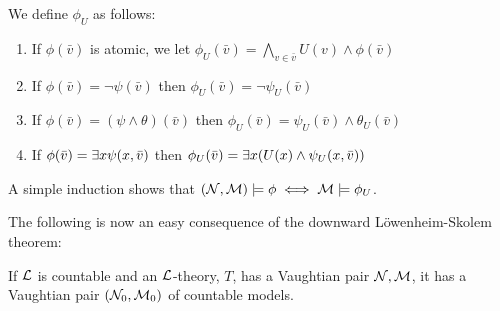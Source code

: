 We define \(\phi_U\) as follows:
\begin{enumerate}
\item If \(\phi(\bar{v})\) is atomic, we let \(\phi_U(\bar{v}) = \bigwedge\limits_{v \in \bar{v}}U(v) \land \phi(\bar{v})\)
\item If \(\phi(\bar{v}) = \neg \psi(\bar{v})\) then \(\phi_U(\bar{v}) = \neg \psi_U(\bar{v})\)
\item If \(\phi(\bar{v}) = (\psi \land \theta)(\bar{v})\) then \(\phi_U(\bar{v}) = \psi_U(\bar{v}) \land \theta_U(\bar{v})\)
\item If \(\phi(\bar{v}) = \exists x \psi(x, \bar{v})\) then \(\phi_U(\bar{v}) = \exists x (U(x) \land \psi_U(x, \bar{v}))\)
\end{enumerate}
A simple induction shows that \((\mathcal{N}, \mathcal{M}) \models \phi \iff \mathcal{M} \models \phi_U\).

The following is now an easy consequence of the downward L\"owenheim-Skolem theorem:

\begin{theorem}\label{theorem_countable_vaughtian_pairs}
If \(\mathcal{L}\) is countable and an \(\mathcal{L}\)-theory, \(T\), has a Vaughtian pair \(\mathcal{N}, \mathcal{M}\), it has a Vaughtian pair \((\mathcal{N}_0, \mathcal{M}_0)\) of countable models. 
\end{theorem}

